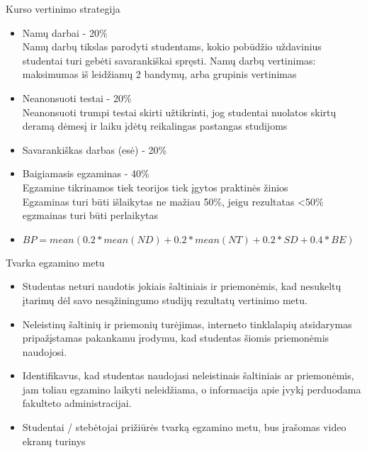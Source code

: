 \documentclass[11pt,xcolor=table]{beamer}
\begin{document}
\begin{frame}{Kurso vertinimo strategija}

\begin{itemize}
\item Namų darbai - 20\%
\\Namų darbų tikslas parodyti studentams, kokio pobūdžio uždavinius studentai turi gebėti savarankiškai spręsti. Namų darbų vertinimas: maksimumas iš leidžiamų 2 bandymų, arba grupinis vertinimas
\item Neanonsuoti testai - 20\%
\\Neanonsuoti trumpi testai skirti užtikrinti, jog studentai nuolatos skirtų deramą dėmesį ir laiku įdėtų reikalingas pastangas studijoms
\item Savarankiškas darbas (esė) - 20\%
\item Baigiamasis egzaminas - 40\% 
\\Egzamine tikrinamos tiek teorijos tiek įgytos praktinės žinios 
\\Egzaminas turi būti išlaikytas ne mažiau 50\%, jeigu rezultatas <50\% egzmainas turi būti perlaikytas
\item $BP=mean(0.2*mean(ND)+0.2*mean(NT)+0.2*SD +0.4*BE)$
\end{itemize}
\end{frame}

\begin{frame}{Tvarka egzamino metu}
\begin{itemize}
\item Studentas neturi naudotis jokiais šaltiniais ir
priemonėmis, kad nesukeltų įtarimų dėl savo
nesąžiningumo studijų rezultatų vertinimo metu.
\item  Neleistinų šaltinių ir priemonių turėjimas, interneto
tinklalapių atsidarymas pripažįstamas pakankamu
įrodymu, kad studentas šiomis priemonėmis
naudojosi.
\item  Identifikavus, kad studentas naudojasi neleistinais
šaltiniais ar priemonėmis, jam toliau egzamino laikyti
neleidžiama, o informacija apie įvykį perduodama
fakulteto administracijai.
\item Studentai / stebėtojai prižiūrės tvarką egzamino
metu, bus įrašomas video ekranų turinys
\end{itemize}
\end{frame}
\end{document}
